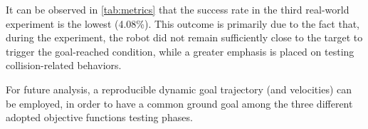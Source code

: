 It can be observed in \autoref{tab:metrics} that the success rate in the third real-world experiment is the lowest (4.08\%). This outcome is primarily due to the fact that, during the experiment, the robot did not remain sufficiently close to the target to trigger the goal-reached condition, while a greater emphasis is placed on testing collision-related behaviors.

For future analysis, a reproducible dynamic goal trajectory (and velocities) can be employed, in order to have a common ground goal among the three different adopted objective functions testing phases.




